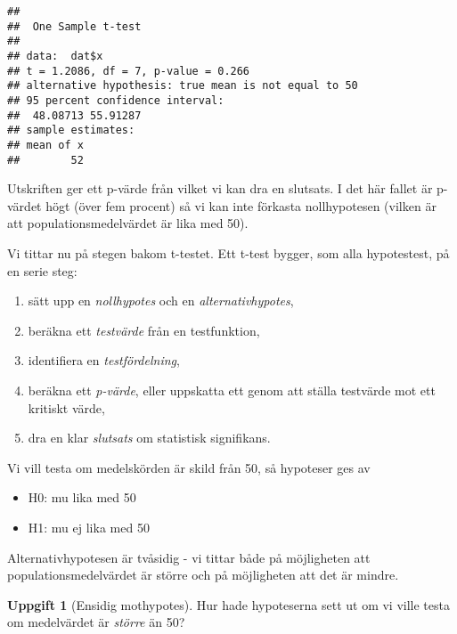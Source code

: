 \documentclass[
]{book}
\newenvironment{Shaded}{\begin{snugshade}}{\end{snugshade}}
\newcommand{\AttributeTok}[1]{\textcolor[rgb]{0.13,0.29,0.53}{#1}}
\newcommand{\CommentTok}[1]{\textcolor[rgb]{0.56,0.35,0.01}{\textit{#1}}}
\newcommand{\DecValTok}[1]{\textcolor[rgb]{0.00,0.00,0.81}{#1}}
\newcommand{\FunctionTok}[1]{\textcolor[rgb]{0.13,0.29,0.53}{\textbf{#1}}}
\newcommand{\NormalTok}[1]{#1}
\newcommand{\SpecialCharTok}[1]{\textcolor[rgb]{0.81,0.36,0.00}{\textbf{#1}}}
\providecommand{\tightlist}{%
  \setlength{\itemsep}{0pt}\setlength{\parskip}{0pt}}
\theoremstyle{definition}
\theoremstyle{definition}
\theoremstyle{definition}
\newtheorem{exercise}{Uppgift}[chapter]
\theoremstyle{definition}
\theoremstyle{remark}
\begin{document}
\begin{Shaded}
\end{Shaded}

\begin{verbatim}
## 
##  One Sample t-test
## 
## data:  dat$x
## t = 1.2086, df = 7, p-value = 0.266
## alternative hypothesis: true mean is not equal to 50
## 95 percent confidence interval:
##  48.08713 55.91287
## sample estimates:
## mean of x 
##        52
\end{verbatim}

Utskriften ger ett p-värde från vilket vi kan dra en slutsats. I det här fallet är p-värdet högt (över fem procent) så vi kan inte förkasta nollhypotesen (vilken är att populationsmedelvärdet är lika med 50).

Vi tittar nu på stegen bakom t-testet.
Ett t-test bygger, som alla hypotestest, på en serie steg:

\begin{enumerate}
\def\labelenumi{\arabic{enumi}.}
\tightlist
\item
  sätt upp en \emph{nollhypotes} och en \emph{alternativhypotes},
\item
  beräkna ett \emph{testvärde} från en testfunktion,
\item
  identifiera en \emph{testfördelning},
\item
  beräkna ett \emph{p-värde}, eller uppskatta ett genom att ställa testvärde mot ett kritiskt värde,
\item
  dra en klar \emph{slutsats} om statistisk signifikans.
\end{enumerate}

Vi vill testa om medelskörden är skild från 50, så hypoteser ges av

\begin{itemize}
\tightlist
\item
  H0: mu lika med 50
\item
  H1: mu ej lika med 50
\end{itemize}

Alternativhypotesen är tvåsidig - vi tittar både på möjligheten att populationsmedelvärdet är större och på möjligheten att det är mindre.

\begin{exercise}[Ensidig mothypotes]
Hur hade hypoteserna sett ut om vi ville testa om medelvärdet är \emph{större} än 50?
\end{exercise}
\end{document}
